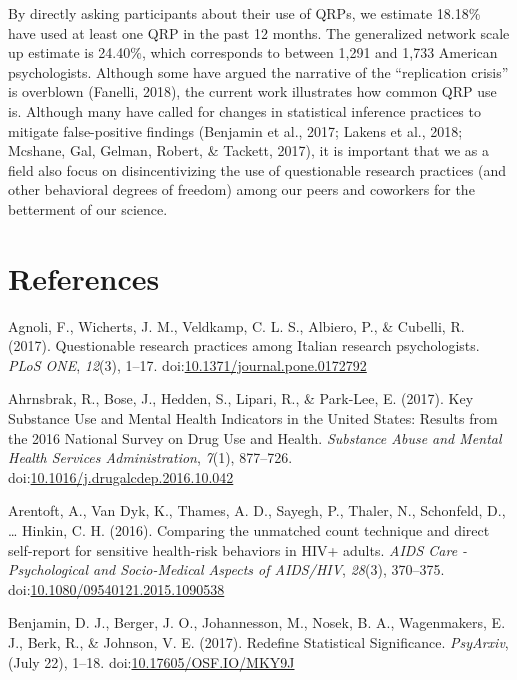\documentclass[jou]{apa6}
\theoremstyle{definition}
\theoremstyle{definition}
\theoremstyle{definition}
\theoremstyle{remark}
\begin{document}
By directly asking participants about their use of QRPs, we estimate
18.18\% have used at least one QRP in the past 12 months. The
generalized network scale up estimate is 24.40\%, which corresponds to
between 1,291 and 1,733 American psychologists. Although some have
argued the narrative of the \enquote{replication crisis} is overblown
(Fanelli, 2018), the current work illustrates how common QRP use is.
Although many have called for changes in statistical inference practices
to mitigate false-positive findings (Benjamin et al., 2017; Lakens et
al., 2018; Mcshane, Gal, Gelman, Robert, \& Tackett, 2017), it is
important that we as a field also focus on disincentivizing the use of
questionable research practices (and other behavioral degrees of
freedom) among our peers and coworkers for the betterment of our
science.

\newpage

\section{References}\label{references}

\begingroup
\setlength{\parindent}{-0.5in} \setlength{\leftskip}{0.5in}

\hypertarget{refs}{}
\hypertarget{ref-Agnoli2017}{}
Agnoli, F., Wicherts, J. M., Veldkamp, C. L. S., Albiero, P., \&
Cubelli, R. (2017). Questionable research practices among Italian
research psychologists. \emph{PLoS ONE}, \emph{12}(3), 1--17.
doi:\href{https://doi.org/10.1371/journal.pone.0172792}{10.1371/journal.pone.0172792}

\hypertarget{ref-Ahrnsbrak2017}{}
Ahrnsbrak, R., Bose, J., Hedden, S., Lipari, R., \& Park-Lee, E. (2017).
Key Substance Use and Mental Health Indicators in the United States:
Results from the 2016 National Survey on Drug Use and Health.
\emph{Substance Abuse and Mental Health Services Administration},
\emph{7}(1), 877--726.
doi:\href{https://doi.org/10.1016/j.drugalcdep.2016.10.042}{10.1016/j.drugalcdep.2016.10.042}

\hypertarget{ref-Arentoft2016}{}
Arentoft, A., Van Dyk, K., Thames, A. D., Sayegh, P., Thaler, N.,
Schonfeld, D., \ldots{} Hinkin, C. H. (2016). Comparing the unmatched
count technique and direct self-report for sensitive health-risk
behaviors in HIV+ adults. \emph{AIDS Care - Psychological and
Socio-Medical Aspects of AIDS/HIV}, \emph{28}(3), 370--375.
doi:\href{https://doi.org/10.1080/09540121.2015.1090538}{10.1080/09540121.2015.1090538}

\hypertarget{ref-Benjamin2017}{}
Benjamin, D. J., Berger, J. O., Johannesson, M., Nosek, B. A.,
Wagenmakers, E. J., Berk, R., \& Johnson, V. E. (2017). Redefine
Statistical Significance. \emph{PsyArxiv}, (July 22), 1--18.
doi:\href{https://doi.org/10.17605/OSF.IO/MKY9J}{10.17605/OSF.IO/MKY9J}
\end{document}
